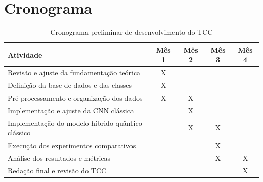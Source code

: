 \documentclass[
    12pt,
    openright,
    oneside,
    a4paper,
    english,
    brazil
]{abntex2}
\begin{document}

\section{Cronograma}


\begin{table}[htb]
\centering
\caption{Cronograma preliminar de desenvolvimento do TCC}
\label{tab:cronograma}
\begin{tabular}{|p{7cm}|c|c|c|c|}
\hline
\textbf{Atividade} & \textbf{Mês 1} & \textbf{Mês 2} & \textbf{Mês 3} & \textbf{Mês 4} \\ \hline
Revisão e ajuste da fundamentação teórica & X &  &  &  \\ \hline
Definição da base de dados e das classes & X &  &  &  \\ \hline
Pré-processamento e organização dos dados & X & X &  &  \\ \hline
Implementação e ajuste da CNN clássica &  & X &  &  \\ \hline
Implementação do modelo híbrido quântico-clássico &  & X & X &  \\ \hline
Execução dos experimentos comparativos &  &  & X &  \\ \hline
Análise dos resultados e métricas &  &  & X & X \\ \hline
Redação final e revisão do TCC &  &  &  & X \\ \hline
\end{tabular}
\end{table}


\postextual


\end{document}
